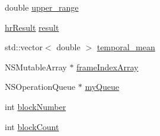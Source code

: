 \begin{DoxyCompactItemize}
\item 
double \hyperlink{category_m_h_r_main_view_controller_07_08_a2cae5817c804f84f5e8db9531d8258c9}{upper\+\_\+range}
\item 
\hyperlink{struct_m_h_r_1_1hr_result}{hr\+Result} \hyperlink{category_m_h_r_main_view_controller_07_08_a9dbae9ee1ba7bf908a253626a618ecf6}{result}
\item 
std\+::vector$<$ double $>$ \hyperlink{category_m_h_r_main_view_controller_07_08_abc8096634910dfbb9d748b376d8506cb}{temporal\+\_\+mean}
\item 
N\+S\+Mutable\+Array $\ast$ \hyperlink{category_m_h_r_main_view_controller_07_08_aaf8cf1ed833d48edb06718b6d7540fae}{frame\+Index\+Array}
\item 
N\+S\+Operation\+Queue $\ast$ \hyperlink{category_m_h_r_main_view_controller_07_08_a77f4256f36d6f6bebf7f82005aec1c62}{my\+Queue}
\item 
int \hyperlink{category_m_h_r_main_view_controller_07_08_a228b693ffc5ea747c93a4206c5b8b98d}{block\+Number}
\item 
int \hyperlink{category_m_h_r_main_view_controller_07_08_a58a5e815d93639db9e1ab9f1da8fa9f9}{block\+Count}
\end{DoxyCompactItemize}
